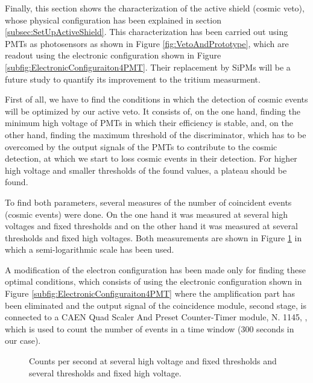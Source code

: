 Finally, this section shows the characterization of the active shield (cosmic veto), whose physical configuration has been explained in section \ref{subsec:SetUpActiveShield}. This characterization has been carried out using PMTs as photosensors as shown in Figure \ref{fig:VetoAndPrototype}, which are readout using the electronic configuration shown in Figure \ref{subfig:ElectronicConfiguraiton4PMT}. Their replacement by SiPMs will be a future study to quantify its improvement to the tritium measurment. 

First of all, we have to find the conditions in which the detection of cosmic events will be optimized by our active veto. It consists of, on the one hand, finding the minimum high voltage of PMTs in which their efficiency is stable, and, on the other hand, finding the maximum threshold of the discriminator, which has to be overcomed by the output signals of the PMTs to contribute to the cosmic detection, at which we start to loss cosmic events in their detection. For higher high voltage and smaller thresholds of the found values, a plateau should be found.

To find both parameters, several measures of the number of coincident events (cosmic events) were done. On the one hand it was measured at several high voltages and fixed thresholds and on the other hand it was measured at several thresholds and fixed high voltages. Both measurements are shown in Figure \ref{fig:HVandThresholdsPLateaus} in which a semi-logarithmic scale has been used.

A modification of the electron configuration has been made only for finding these optimal conditions, which consists of using the electronic configuration shown in Figure \ref{subfig:ElectronicConfiguraiton4PMT} where the amplification part has been eliminated and the output signal of the coincidence module, second stage, is connected to a CAEN Quad Scaler And Preset Counter-Timer module, N. 1145, \cite{ScalerDataSheet}, which is used to count the number of events in a time window ($300$ seconds in our case).

\begin{figure}[]
 \centering
    \newline
 \caption{Counts per second at several high voltage and fixed thresholds and several thresholds and fixed high voltage.}
 \label{fig:HVandThresholdsPLateaus}
\end{figure}

